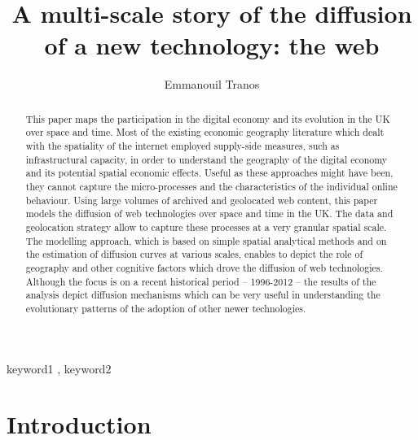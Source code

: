 \documentclass[
  authoryear,
  preprint,
  3p]{elsarticle}
\begin{document}
\begin{frontmatter}
\title{A multi-scale story of the diffusion of a new technology: the
web}
\author[1]{Emmanouil Tranos%
%
}



        
\begin{abstract}
This paper maps the participation in the digital economy and its
evolution in the UK over space and time. Most of the existing economic
geography literature which dealt with the spatiality of the internet
employed supply-side measures, such as infrastructural capacity, in
order to understand the geography of the digital economy and its
potential spatial economic effects. Useful as these approaches might
have been, they cannot capture the micro-processes and the
characteristics of the individual online behaviour. Using large volumes
of archived and geolocated web content, this paper models the diffusion
of web technologies over space and time in the UK. The data and
geolocation strategy allow to capture these processes at a very granular
spatial scale. The modelling approach, which is based on simple spatial
analytical methods and on the estimation of diffusion curves at various
scales, enables to depict the role of geography and other cognitive
factors which drove the diffusion of web technologies. Although the
focus is on a recent historical period -- 1996-2012 -- the results of
the analysis depict diffusion mechanisms which can be very useful in
understanding the evolutionary patterns of the adoption of other newer
technologies.
\end{abstract}





\begin{keyword}
    keyword1 \sep 
    keyword2
\end{keyword}
\end{frontmatter}
    
\section{Introduction}\label{sec-introduction}
\end{document}
